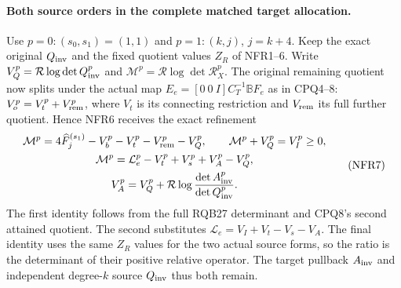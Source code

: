 \documentclass[11pt,a4paper]{article}
\begin{document}
\paragraph{Both source orders in the complete matched target allocation.}
Use $p=0:(s_0,s_1)=(1,1)$ and $p=1:(k,j)$, $j=k+4$.
Keep the exact original $Q_{\rm inv}$ and the fixed quotient values
$Z_R$ of NFR1--6. Write
$V_Q^p=\mathcal R\log\det Q_{\rm inv}^p$ and
$\mathcal M^p=\mathcal R\log\det\mathscr R_X^p$.
The original remaining quotient now splits under the actual
map $E_e=[0\ 0\ I]C_T^{-1}\mathbb BF_e$ as in CPQ4--8:
$V_o^p=V_t^p+V_{\rm rem}^p$, where $V_t$ is its connecting
restriction and $V_{\rm rem}$ its full further quotient.
Hence NFR6 receives the exact refinement
\[
 \begin{gathered}
 \mathcal M^p=4\widehat F_j^{(s_1)}
             -V_b^p-V_t^p-V_{\rm rem}^p-V_Q^p,\qquad
 \mathcal M^p+V_Q^p=V_I^p\ge0,\\
 \mathcal M^p=\mathcal L_e^p-V_t^p+V_s^p+V_A^p-V_Q^p,\\
 V_A^p=V_Q^p+
       \mathcal R\log\frac{\det A_{\rm inv}^p}{\det Q_{\rm inv}^p}.
 \end{gathered}\tag{NFR7}
\]
The first identity follows from the full RQB27 determinant and
CPQ8's second attained quotient. The second substitutes
$\mathcal L_e=V_I+V_t-V_s-V_A$. The final identity uses the
same $Z_R$ values for the two actual source forms, so the
ratio is the determinant of their positive relative operator.
The target pullback $A_{\rm inv}$ and independent degree-$k$
source $Q_{\rm inv}$ thus both remain.
\end{document}
